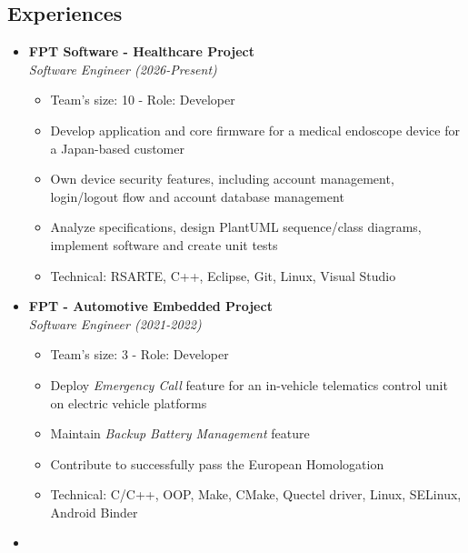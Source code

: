 \documentclass[10pt,oneside,a4paper]{article}
\begin{document}
\begin{tcolorbox}
\begin{minipage}[t]{11cm}
\begin{tcolorbox}[grow to right by=0.75cm,colback=white,colframe=white]
            \section*{Experiences}
            \begin{itemize}
                \item
                {
                    \textbf{FPT Software - Healthcare Project} \\
                    \emph{Software Engineer (2026-Present)}
                    \begin{itemize}[label=$\circ$]
                        \item {Team's size: 10 - Role: Developer}
                        \item {Develop application and core firmware for a medical endoscope device for a Japan-based customer}
                        \item {Own device security features, including account management, login/logout flow and account database management}
                        \item {Analyze specifications, design PlantUML sequence/class diagrams, implement software and create unit tests}
                        \item {Technical: RSARTE, C++, Eclipse, Git, Linux, Visual Studio}
                    \end{itemize}
                }
                \item 
                {
                    \textbf{FPT - Automotive Embedded Project} \\
                    \emph{Software Engineer (2021-2022)}
                    \begin{itemize}[label=$\circ$]
                        \item {Team's size: 3 - Role: Developer}
                        \item {Deploy \textit{Emergency Call} feature for an in-vehicle telematics control unit on electric vehicle platforms}
                        \item {Maintain \textit{Backup Battery Management} feature}
                        \item {Contribute to successfully pass the European Homologation}
                        \item {Technical: C/C++, OOP, Make, CMake, Quectel driver, Linux, SELinux, Android Binder}
                    \end{itemize}
                }
                \item

\end{itemize}
\end{tcolorbox}
\end{minipage}
\end{tcolorbox}
\end{document}
